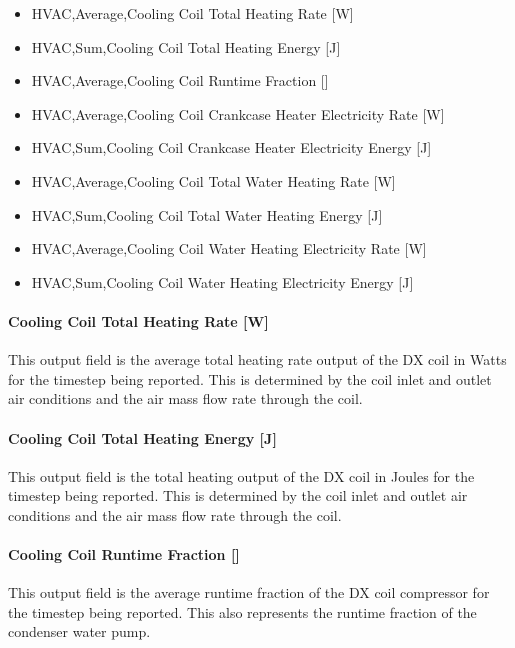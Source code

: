 \begin{itemize}
\item
  HVAC,Average,Cooling Coil Total Heating Rate {[}W{]}
\item
  HVAC,Sum,Cooling Coil Total Heating Energy {[}J{]}
\item
  HVAC,Average,Cooling Coil Runtime Fraction {[]}
\item
  HVAC,Average,Cooling Coil Crankcase Heater Electricity Rate {[}W{]}
\item
  HVAC,Sum,Cooling Coil Crankcase Heater Electricity Energy {[}J{]}
\item
  HVAC,Average,Cooling Coil Total Water Heating Rate {[}W{]}
\item
  HVAC,Sum,Cooling Coil Total Water Heating Energy {[}J{]}
\item
  HVAC,Average,Cooling Coil Water Heating Electricity Rate {[}W{]}
\item
  HVAC,Sum,Cooling Coil Water Heating Electricity Energy {[}J{]}
\end{itemize}

\paragraph{Cooling Coil Total Heating Rate {[}W{]}}\label{heating-coil-total-heating-rate-w-6}

This output field is the average total heating rate output of the DX coil in Watts for the timestep being reported. This is determined by the coil inlet and outlet air conditions and the air mass flow rate through the coil.

\paragraph{Cooling Coil Total Heating Energy {[}J{]}}\label{heating-coil-total-heating-energy-j-6}

This output field is the total heating output of the DX coil in Joules for the timestep being reported. This is determined by the coil inlet and outlet air conditions and the air mass flow rate through the coil.

\paragraph{Cooling Coil Runtime Fraction {[]}}\label{heating-coil-runtime-fraction-4}

This output field is the average runtime fraction of the DX coil compressor for the timestep being reported. This also represents the runtime fraction of the condenser water pump.

